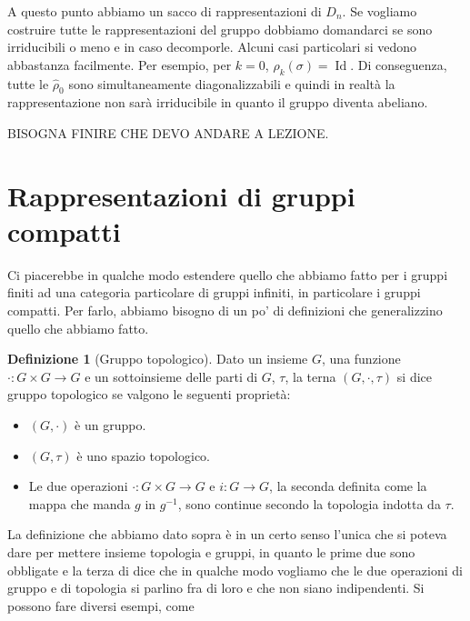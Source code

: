 \documentclass[11pt]{article}
\theoremstyle{plain}
\theoremstyle{definition}
\newtheorem{defn}{Definizione}[section]
\theoremstyle{remark}
\DeclareMathOperator{\Id}{Id}
\begin{document}
A questo punto abbiamo un sacco di rappresentazioni di $D_{n}$. Se vogliamo costruire tutte le rappresentazioni del gruppo dobbiamo domandarci se sono irriducibili o meno e in caso decomporle. Alcuni casi particolari si vedono abbastanza facilmente. Per esempio, per $k=0$, $\hat \rho_k(\sigma) = \Id$. Di conseguenza, tutte le $\hat \rho_0$ sono simultaneamente diagonalizzabili e quindi in realtà la rappresentazione non sarà irriducibile in quanto il gruppo diventa abeliano.



BISOGNA FINIRE CHE DEVO ANDARE A LEZIONE.






















\newpage
\section{Rappresentazioni di gruppi compatti}

Ci piacerebbe in qualche modo estendere quello che abbiamo fatto per i gruppi finiti ad una categoria particolare di gruppi infiniti, in particolare i gruppi compatti. Per farlo, abbiamo bisogno di un po' di definizioni che generalizzino quello che abbiamo fatto. 


\begin{defn}[Gruppo topologico] Dato un insieme $G$, una funzione $\cdot: G\times G \to G$ e un sottoinsieme delle parti di $G$, $\tau$, la terna $(G, \cdot, \tau)$ si dice gruppo topologico se valgono le seguenti proprietà:

\begin{itemize}
\item $(G, \cdot)$ è un gruppo.
\item $(G, \tau)$ è uno spazio topologico.
\item Le due operazioni $\cdot : G \times G \to G$ e $i: G \to G$, la seconda definita come la mappa che manda $g $ in $g^{-1}$,  sono continue secondo la topologia indotta da $\tau$.
\end{itemize}

\end{defn}


La definizione che abbiamo dato sopra è in un certo senso l'unica che si poteva dare per mettere insieme topologia e gruppi, in quanto le prime due sono obbligate e la terza di dice che in qualche modo vogliamo che le due operazioni di gruppo e di topologia si parlino fra di loro e che non siano indipendenti. Si possono fare diversi esempi, come
\end{document}
